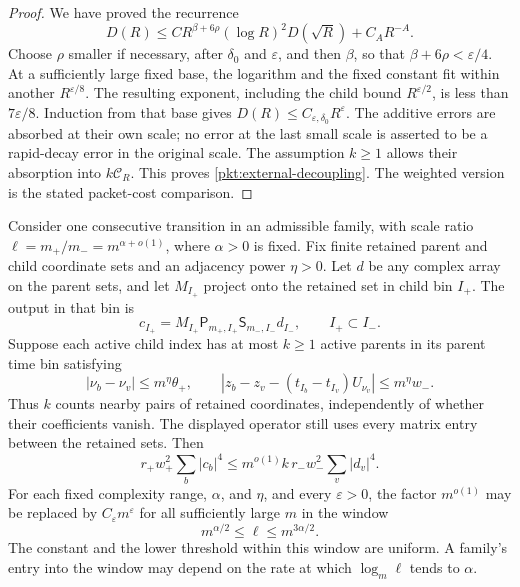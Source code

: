 \begin{proof}
We have proved the recurrence
\[
 D(R)\le
 C R^{\beta+6\rho}(\log R)^2D(\sqrt R)+C_A R^{-A}.
\]
Choose \(\rho\) smaller if necessary, after \(\delta_0\) and
\(\varepsilon\), and then \(\beta\), so that
\(\beta+6\rho<\varepsilon/4\). At a sufficiently large fixed base,
the logarithm and the fixed constant fit within another
\(R^{\varepsilon/8}\). The resulting exponent, including the
child bound \(R^{\varepsilon/2}\), is less than
\(7\varepsilon/8\). Induction from that base gives
\(D(R)\le C_{\varepsilon,\delta_0}R^\varepsilon\). The additive errors are absorbed
at their own scale; no error at the last small scale is asserted
to be a rapid-decay error in the original scale. The assumption
\(k\ge1\) allows their absorption into \(k\mathcal C_R\).
This proves \eqref{pkt:external-decoupling}.
The weighted version is the stated packet-cost comparison.
\end{proof}

\begin{proposition}
\label{pkt:quartic}
Consider one consecutive transition in an admissible family, with
scale ratio $\ell=m_+/m_-=m^{\alpha+o(1)}$, where $\alpha>0$ is fixed.
Fix finite retained parent and child coordinate sets and an adjacency
power $\eta>0$.  Let $d$ be any complex array on the parent sets, and
let $M_{I_+}$ project onto the retained set in child bin $I_+$.  The
output in that bin is
\[
 c_{I_+}=M_{I_+}\mathsf P_{m_+,I_+}
                    \mathsf S_{m_-,I_-}d_{I_-},
 \qquad I_+\subset I_-.
\]
Suppose each active child index has at most $k\ge1$ active parents in
its parent time bin satisfying
\[
 |\nu_b-\nu_v|\le m^\eta\theta_+,
 \qquad
 |z_b-z_v-(t_{I_b}-t_{I_v})U_{\nu_v}|
       \le m^\eta w_-.
\]
Thus $k$ counts nearby pairs of retained coordinates, independently of
whether their coefficients vanish.  The displayed operator still uses
every matrix entry between the retained sets.  Then
\begin{equation}\label{eq:source-33}
 r_+w_+^2\sum_b|c_b|^4
       \le m^{o(1)} k\,r_-w_-^2\sum_v|d_v|^4.
\end{equation}
For each fixed complexity range, $\alpha$, and $\eta$, and every
$\varepsilon>0$, the factor $m^{o(1)}$ may be replaced by
$C_\varepsilon m^\varepsilon$ for all sufficiently large $m$ in the
window
\[
 m^{\alpha/2}\le\ell\le m^{3\alpha/2}.
\]
The constant and the lower threshold within this window are uniform.
A family's entry into the window may depend on the rate at which
$\log_m\ell$ tends to $\alpha$.
\end{proposition}


